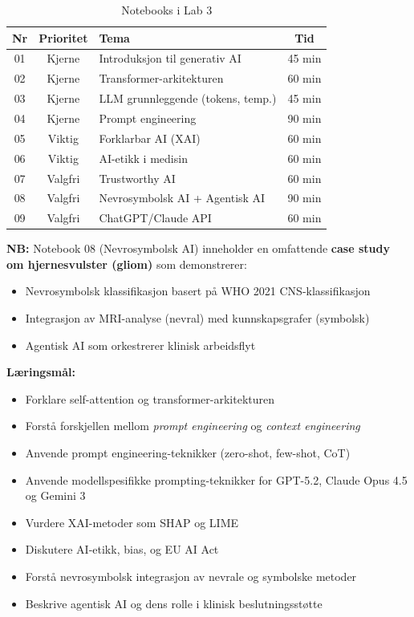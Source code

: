 \documentclass[11pt,a4paper]{article}
\begin{document}
\begin{table}[htbp]
\centering
\caption{Notebooks i Lab 3}
\label{tab:lab3}
\begin{tabular}{@{}ccp{6cm}c@{}}
\toprule
\textbf{Nr} & \textbf{Prioritet} & \textbf{Tema} & \textbf{Tid} \\
\midrule
01 & \textcolor{corecolor}{Kjerne} & Introduksjon til generativ AI & 45 min \\
02 & \textcolor{corecolor}{Kjerne} & Transformer-arkitekturen & 60 min \\
03 & \textcolor{corecolor}{Kjerne} & LLM grunnleggende (tokens, temp.) & 45 min \\
04 & \textcolor{corecolor}{Kjerne} & Prompt engineering & 90 min \\
\midrule
05 & \textcolor{recommendedcolor}{Viktig} & Forklarbar AI (XAI) & 60 min \\
06 & \textcolor{recommendedcolor}{Viktig} & AI-etikk i medisin & 60 min \\
\midrule
07 & \textcolor{optionalcolor}{Valgfri} & Trustworthy AI & 60 min \\
08 & \textcolor{optionalcolor}{Valgfri} & Nevrosymbolsk AI + Agentisk AI & 90 min \\
09 & \textcolor{optionalcolor}{Valgfri} & ChatGPT/Claude API & 60 min \\
\bottomrule
\end{tabular}
\end{table}

\textbf{NB:} Notebook 08 (Nevrosymbolsk AI) inneholder en omfattende \textbf{case study om hjernesvulster (gliom)} som demonstrerer:
\begin{itemize}[nosep]
    \item Nevrosymbolsk klassifikasjon basert på WHO 2021 CNS-klassifikasjon
    \item Integrasjon av MRI-analyse (nevral) med kunnskapsgrafer (symbolsk)
    \item Agentisk AI som orkestrerer klinisk arbeidsflyt
\end{itemize}

\textbf{Læringsmål:}
\begin{itemize}[nosep]
    \item Forklare self-attention og transformer-arkitekturen
    \item Forstå forskjellen mellom \emph{prompt engineering} og \emph{context engineering}
    \item Anvende prompt engineering-teknikker (zero-shot, few-shot, CoT)
    \item Anvende modellspesifikke prompting-teknikker for GPT-5.2, Claude Opus 4.5 og Gemini 3
    \item Vurdere XAI-metoder som SHAP og LIME
    \item Diskutere AI-etikk, bias, og EU AI Act
    \item Forstå nevrosymbolsk integrasjon av nevrale og symbolske metoder
    \item Beskrive agentisk AI og dens rolle i klinisk beslutningsstøtte
\end{itemize}
\end{document}
